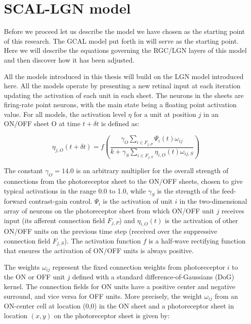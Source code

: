 \section{SCAL-LGN model}

Before we proceed let us describe the model we have chosen as the
starting point of this research. The GCAL model put forth in
\cite{Stevens2013} will serve as the starting point. Here we will
describe the equations governing the RGC/LGN layers of this model and
then discover how it has been adjusted.

All the models introduced in this thesis will build on the LGN model
introduced here. All the models operate by presenting a new retinal
input at each iteration updating the activation of each unit in each
sheet. The neurons in the sheets are firing-rate point neurons, with
the main state being a floating point activation value.  For all
models, the activation level $\eta$ for a unit at position $j$ in an
ON/OFF sheet O at time $t+\delta t$ is defined as:

\begin{equation}
\eta_{j, O}(t+\delta t)=f\left(\frac{\gamma_{O}\sum_{i\in
    F_{j,P}}\Psi_{i}(t)\omega_{ij}}{k+\gamma_{S}\sum_{i\in
    F_{j,S}}\eta_{i, O}(t)\omega_{ij, S}}\right)
\label{eqn:lgnactivation}
\end{equation}

The constant $\gamma_{O}=14.0$ is an arbitrary multiplier for the
overall strength of connections from the photoreceptor sheet to the
ON/OFF sheets, chosen to give typical activations in the range 0.0 to
1.0, while $\gamma_{S}$ is the strength of the feed-forward
contrast-gain control. $\Psi_{i}$ is the activation of unit $i$ in the
two-dimensional array of neurons on the photoreceptor sheet from which
ON/OFF unit $j$ receives input (its afferent connection field
$F_{j,P}$) and $\eta_{i, O}(t)$ is the activation of other ON/OFF
units on the previous time step (received over the suppressive
connection field $F_{j,S}$). The activation function $f$ is a
half-wave rectifying function that ensures the activation of ON/OFF
units is always positive.

The weights $\omega_{ij}$ represent the fixed connection weights from
photoreceptor $i$ to the ON or OFF unit $j$ defined with a standard
difference-of-Gaussians (DoG) kernel. The connection fields for ON units
have a positive center and negative surround, and vice versa for OFF
units. More precisely, the weight $\omega_{ij}$ from an ON-center cell
at location (0,0) in the ON sheet and a photoreceptor sheet in
location $(x,y)$ on the photoreceptor sheet is given by:

